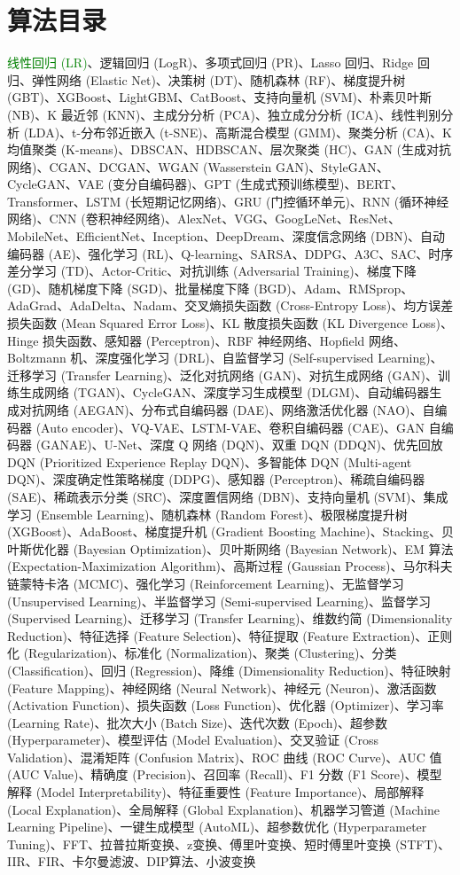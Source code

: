 \section*{算法目录}
\textcolor{green}{线性回归 (LR)}、逻辑回归 (LogR)、多项式回归 (PR)、Lasso 回归、Ridge 回归、弹性网络 (Elastic Net)、决策树 (DT)、随机森林 (RF)、梯度提升树 (GBT)、XGBoost、LightGBM、CatBoost、支持向量机 (SVM)、朴素贝叶斯 (NB)、K 最近邻 (KNN)、主成分分析 (PCA)、独立成分分析 (ICA)、线性判别分析 (LDA)、t-分布邻近嵌入 (t-SNE)、高斯混合模型 (GMM)、聚类分析 (CA)、K 均值聚类 (K-means)、DBSCAN、HDBSCAN、层次聚类 (HC)、GAN (生成对抗网络)、CGAN、DCGAN、WGAN (Wasserstein GAN)、StyleGAN、CycleGAN、VAE (变分自编码器)、GPT (生成式预训练模型)、BERT、Transformer、LSTM (长短期记忆网络)、GRU (门控循环单元)、RNN (循环神经网络)、CNN (卷积神经网络)、AlexNet、VGG、GoogLeNet、ResNet、MobileNet、EfficientNet、Inception、DeepDream、深度信念网络 (DBN)、自动编码器 (AE)、强化学习 (RL)、Q-learning、SARSA、DDPG、A3C、SAC、时序差分学习 (TD)、Actor-Critic、对抗训练 (Adversarial Training)、梯度下降 (GD)、随机梯度下降 (SGD)、批量梯度下降 (BGD)、Adam、RMSprop、AdaGrad、AdaDelta、Nadam、交叉熵损失函数 (Cross-Entropy Loss)、均方误差损失函数 (Mean Squared Error Loss)、KL 散度损失函数 (KL Divergence Loss)、Hinge 损失函数、感知器 (Perceptron)、RBF 神经网络、Hopfield 网络、Boltzmann 机、深度强化学习 (DRL)、自监督学习 (Self-supervised Learning)、迁移学习 (Transfer Learning)、泛化对抗网络 (GAN)、对抗生成网络 (GAN)、训练生成网络 (TGAN)、CycleGAN、深度学习生成模型 (DLGM)、自动编码器生成对抗网络 (AEGAN)、分布式自编码器 (DAE)、网络激活优化器 (NAO)、自编码器 (Auto encoder)、VQ-VAE、LSTM-VAE、卷积自编码器 (CAE)、GAN 自编码器 (GANAE)、U-Net、深度 Q 网络 (DQN)、双重 DQN (DDQN)、优先回放 DQN (Prioritized Experience Replay DQN)、多智能体 DQN (Multi-agent DQN)、深度确定性策略梯度 (DDPG)、感知器 (Perceptron)、稀疏自编码器 (SAE)、稀疏表示分类 (SRC)、深度置信网络 (DBN)、支持向量机 (SVM)、集成学习 (Ensemble Learning)、随机森林 (Random Forest)、极限梯度提升树 (XGBoost)、AdaBoost、梯度提升机 (Gradient Boosting Machine)、Stacking、贝叶斯优化器 (Bayesian Optimization)、贝叶斯网络 (Bayesian Network)、EM 算法 (Expectation-Maximization Algorithm)、高斯过程 (Gaussian Process)、马尔科夫链蒙特卡洛 (MCMC)、强化学习 (Reinforcement Learning)、无监督学习 (Unsupervised Learning)、半监督学习 (Semi-supervised Learning)、监督学习 (Supervised Learning)、迁移学习 (Transfer Learning)、维数约简 (Dimensionality Reduction)、特征选择 (Feature Selection)、特征提取 (Feature Extraction)、正则化 (Regularization)、标准化 (Normalization)、聚类 (Clustering)、分类 (Classification)、回归 (Regression)、降维 (Dimensionality Reduction)、特征映射 (Feature Mapping)、神经网络 (Neural Network)、神经元 (Neuron)、激活函数 (Activation Function)、损失函数 (Loss Function)、优化器 (Optimizer)、学习率 (Learning Rate)、批次大小 (Batch Size)、迭代次数 (Epoch)、超参数 (Hyperparameter)、模型评估 (Model Evaluation)、交叉验证 (Cross Validation)、混淆矩阵 (Confusion Matrix)、ROC 曲线 (ROC Curve)、AUC 值 (AUC Value)、精确度 (Precision)、召回率 (Recall)、F1 分数 (F1 Score)、模型解释 (Model Interpretability)、特征重要性 (Feature Importance)、局部解释 (Local Explanation)、全局解释 (Global Explanation)、机器学习管道 (Machine Learning Pipeline)、一键生成模型 (AutoML)、超参数优化 (Hyperparameter Tuning)、FFT、拉普拉斯变换、z变换、傅里叶变换、短时傅里叶变换 (STFT)、IIR、FIR、卡尔曼滤波、DIP算法、小波变换